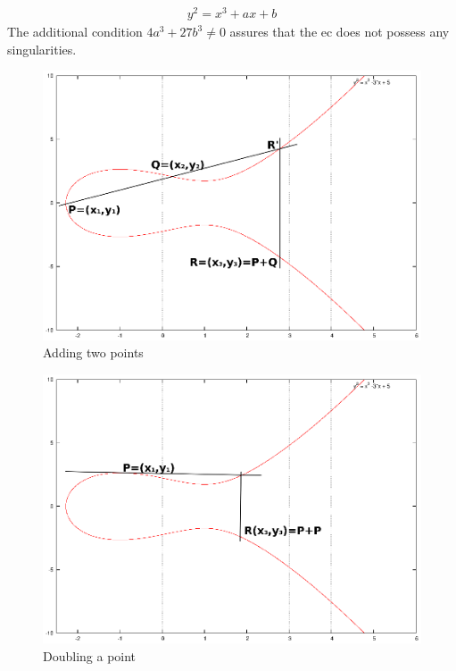 \begin{align}\label{basicEC}
 y^2 = x^3 + ax +b
\end{align}
The additional condition $4a^3 + 27b^3 \neq 0$ assures that the \gls{ec} does not possess any singularities.

\begin{minipage}{\linewidth}
      \begin{minipage}{0.5\linewidth}
          \begin{figure}[H]
              \includegraphics[width=\linewidth]{figures/ecAdd.eps}
              \caption{Adding two points}
              \label{fig:ecAdd}
          \end{figure}
      \end{minipage}
      \begin{minipage}{0.5\linewidth}
          \begin{figure}[H]
              \includegraphics[width=\linewidth]{figures/doubleEC.eps}
              \caption{Doubling a point}
              \label{fig:ecDouble}
          \end{figure}
      \end{minipage}
  \end{minipage}
